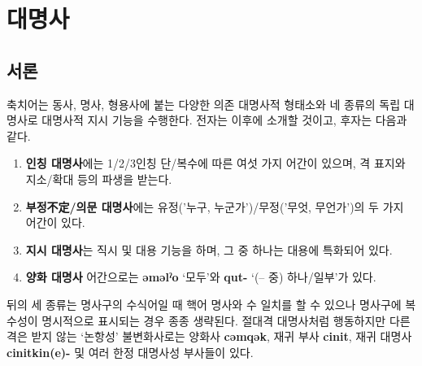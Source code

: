 \setcounter{section}{6}
\section{대명사}
\subsection{서론}
축치어는 동사, 명사, 형용사에 붙는 다양한 의존 대명사적 형태소와 네 종류의 독립 대명사로 대명사적 지시 기능을 수행한다. 전자는 이후에 소개할 것이고, 후자는 다음과 같다.
\begin{enumerate}
	\item \textbf{인칭 대명사}에는 1/2/3인칭 단/복수에 따른 여섯 가지 어간이 있으며, 격 표지와 지소/확대 등의 파생을 받는다.
	\item \textbf{부정不定/의문 대명사}에는 유정('누구, 누군가')/무정('무엇, 무언가')의 두 가지 어간이 있다.
	\item \textbf{지시 대명사}는 직시 및 대용 기능을 하며, 그 중 하나는 대용에 특화되어 있다.
	\item \textbf{양화 대명사} 어간으로는 \textbf{əməlˀo} `모두'와 \textbf{qut-} `(-- 중) 하나/일부'가 있다.
\end{enumerate}
뒤의 세 종류는 명사구의 수식어일 때 핵어 명사와 수 일치를 할 수 있으나 명사구에 복수성이 명시적으로 표시되는 경우 종종 생략된다. 절대격 대명사처럼 행동하지만 다른 격은 받지 않는 `논항성' 불변화사로는 양화사 \textbf{cəmqək}, 재귀 부사 \textbf{cinit}, 재귀 대명사 \textbf{cinitkin(e)-} 및 여러 한정 대명사성 부사들이 있다.
